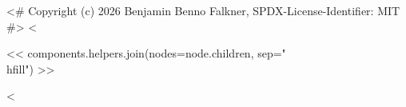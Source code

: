 <# Copyright (c) 2026 Benjamin Benno Falkner, SPDX-License-Identifier: MIT #>
<%
\begin{center}
<< components.helpers.join(nodes=node.children, sep="\n\\hfill\n") >>
\end{center}
<%
